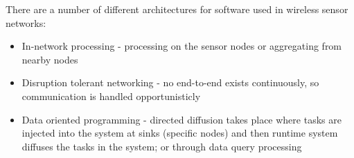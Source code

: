 There are a number of different architectures for software used in wireless sensor networks:
\begin{itemize}
    \item In-network processing - processing on the sensor nodes or aggregating from nearby nodes
    \item Disruption tolerant networking - no end-to-end exists continuously, so communication is handled opportunisticly
    \item Data oriented programming - directed diffusion takes place where tasks are injected into the system at sinks (specific nodes) and then runtime system diffuses the tasks in the system; or through data query processing
\end{itemize}
